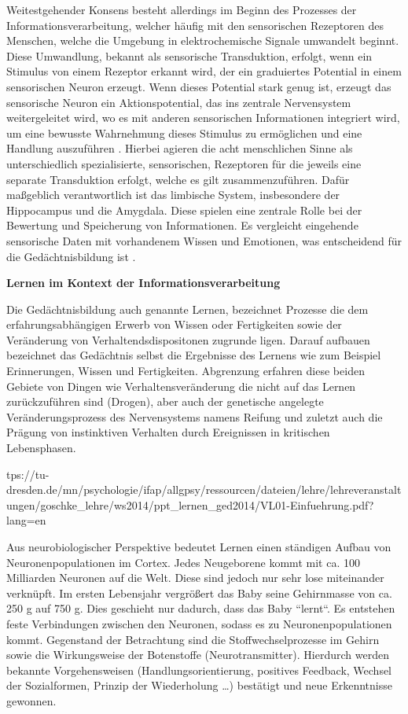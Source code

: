 Weitestgehender Konsens besteht allerdings im Beginn des Prozesses der Informationsverarbeitung, welcher häufig mit den sensorischen Rezeptoren des Menschen, welche die Umgebung in elektrochemische Signale umwandelt beginnt. Diese Umwandlung, bekannt als sensorische Transduktion, erfolgt, wenn ein Stimulus von einem Rezeptor erkannt wird, der ein graduiertes Potential in einem sensorischen Neuron erzeugt. Wenn dieses Potential stark genug ist, erzeugt das sensorische Neuron ein Aktionspotential, das ins zentrale Nervensystem weitergeleitet wird, wo es mit anderen sensorischen Informationen integriert wird, um eine bewusste Wahrnehmung dieses Stimulus zu ermöglichen und eine Handlung auszuführen \cite{BasicHumanPhysiology, AnatomyPhysiology}. Hierbei agieren die acht menschlichen Sinne als unterschiedlich spezialisierte, sensorischen, Rezeptoren für die jeweils eine separate Transduktion erfolgt, welche es gilt zusammenzuführen. Dafür maßgeblich verantwortlich ist das limbische System, insbesondere der Hippocampus und die Amygdala. Diese spielen eine zentrale Rolle bei der Bewertung und Speicherung von Informationen. Es vergleicht eingehende sensorische Daten mit vorhandenem Wissen und Emotionen, was entscheidend für die Gedächtnisbildung ist \cite{WÜRZ, UllmannLimbicSystem}.

\textbf{Lernen im Kontext der Informationsverarbeitung}

Die Gedächtnisbildung auch genannte Lernen, bezeichnet Prozesse die dem erfahrungsabhängigen Erwerb von Wissen oder Fertigkeiten sowie der Veränderung von Verhaltendsdispositonen zugrunde ligen.
Darauf aufbauen bezeichnet das Gedächtnis selbst die Ergebnisse des Lernens wie zum Beispiel Erinnerungen, Wissen und Fertigkeiten. 
Abgrenzung erfahren diese beiden Gebiete von Dingen wie Verhaltensveränderung die nicht auf das Lernen zurückzuführen sind (Drogen), aber auch der genetische angelegte Veränderungsprozess des Nervensystems namens Reifung und zuletzt auch die Prägung von instinktiven Verhalten durch Ereignissen in kritischen Lebensphasen.\cite[S. 16-18]{TUD-VL01}

tps://tu-dresden.de/mn/psychologie/ifap/allgpsy/ressourcen/dateien/lehre/lehreveranstaltungen/goschke\_lehre/ws2014/ppt\_lernen\_ged2014/VL01-Einfuehrung.pdf?lang=en

Aus neurobiologischer Perspektive bedeutet Lernen einen ständigen Aufbau
von Neuronenpopulationen im Cortex. Jedes Neugeborene kommt mit ca.
100 Milliarden Neuronen auf die Welt. Diese sind jedoch nur sehr lose
miteinander verknüpft. Im ersten Lebensjahr vergrößert das Baby seine
Gehirnmasse von ca. 250 g auf 750 g. Dies geschieht nur dadurch, dass das
Baby “lernt“. Es entstehen feste Verbindungen zwischen den Neuronen,
sodass es zu Neuronenpopulationen kommt.
Gegenstand der Betrachtung sind die Stoffwechselprozesse im Gehirn sowie
die Wirkungsweise der Botenstoffe (Neurotransmitter). Hierdurch werden
bekannte Vorgehensweisen (Handlungsorientierung, positives Feedback,
Wechsel der Sozialformen, Prinzip der Wiederholung …) bestätigt und neue
Erkenntnisse gewonnen.

